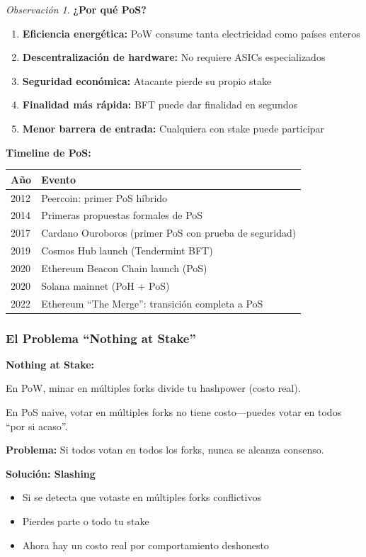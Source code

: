 \documentclass[11pt,a4paper,twoside,openright]{book}
\theoremstyle{definition}
\theoremstyle{plain}
\theoremstyle{remark}
\newtheorem{remark}{Observación}[chapter]
\begin{document}
\begin{remark}
\textbf{¿Por qué PoS?}

\begin{enumerate}
    \item \textbf{Eficiencia energética:} PoW consume tanta electricidad como países enteros
    \item \textbf{Descentralización de hardware:} No requiere ASICs especializados
    \item \textbf{Seguridad económica:} Atacante pierde su propio stake
    \item \textbf{Finalidad más rápida:} BFT puede dar finalidad en segundos
    \item \textbf{Menor barrera de entrada:} Cualquiera con stake puede participar
\end{enumerate}

\textbf{Timeline de PoS:}
\begin{center}
\begin{tabular}{ll}
\toprule
\textbf{Año} & \textbf{Evento} \\
\midrule
2012 & Peercoin: primer PoS híbrido \\
2014 & Primeras propuestas formales de PoS \\
2017 & Cardano Ouroboros (primer PoS con prueba de seguridad) \\
2019 & Cosmos Hub launch (Tendermint BFT) \\
2020 & Ethereum Beacon Chain launch (PoS) \\
2020 & Solana mainnet (PoH + PoS) \\
2022 & Ethereum ``The Merge'': transición completa a PoS \\
\bottomrule
\end{tabular}
\end{center}
\end{remark}

\subsubsection{El Problema ``Nothing at Stake''}

\begin{advertencia}
\textbf{Nothing at Stake:}

En PoW, minar en múltiples forks divide tu hashpower (costo real).

En PoS naive, votar en múltiples forks no tiene costo---puedes votar en todos ``por si acaso''.

\textbf{Problema:} Si todos votan en todos los forks, nunca se alcanza consenso.

\textbf{Solución: Slashing}
\begin{itemize}
    \item Si se detecta que votaste en múltiples forks conflictivos
    \item Pierdes parte o todo tu stake
    \item Ahora hay un costo real por comportamiento deshonesto
\end{itemize}
\end{advertencia}
\end{document}
